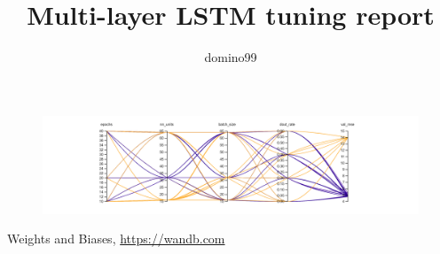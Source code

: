 \documentclass{article}
\title{Multi-layer LSTM tuning report}
\author{%
  domino99
}
\begin{document}
\maketitle
\begin{figure}[ht]
\includegraphics[width=0.5\linewidth]{charts/Section-0-Panel-0-yqjmipbpz}
\end{figure}
\begin{thebibliography}{9}
  Weights and Biases,
  \href{https://app.wandb.ai/fiscal-forcast/IMF/reports/Multi-layer-LSTM-tuning-report--Vmlldzo3MDAwMw}{https://wandb.com}
\end{thebibliography}
\end{document}
